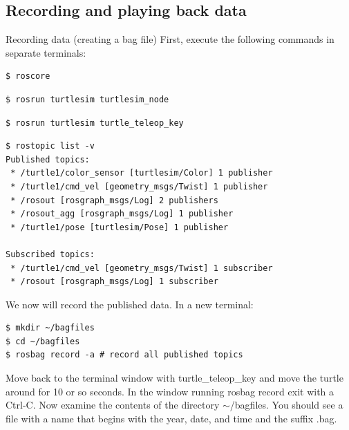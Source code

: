 \subsection{Recording and playing back data}

\begin{frame}{Recording data (creating a bag file)}
First, execute the following commands in separate terminals:
\begin{lstlisting}[language=shell]
$ roscore
\end{lstlisting}
\begin{lstlisting}[language=shell]
$ rosrun turtlesim turtlesim_node 
\end{lstlisting}
\begin{lstlisting}[language=shell]
$ rosrun turtlesim turtle_teleop_key
\end{lstlisting}
\begin{lstlisting}[language=shell]
$ rostopic list -v
Published topics:
 * /turtle1/color_sensor [turtlesim/Color] 1 publisher
 * /turtle1/cmd_vel [geometry_msgs/Twist] 1 publisher
 * /rosout [rosgraph_msgs/Log] 2 publishers
 * /rosout_agg [rosgraph_msgs/Log] 1 publisher
 * /turtle1/pose [turtlesim/Pose] 1 publisher

Subscribed topics:
 * /turtle1/cmd_vel [geometry_msgs/Twist] 1 subscriber
 * /rosout [rosgraph_msgs/Log] 1 subscriber
\end{lstlisting}

We now will record the published data. In a new terminal:
\begin{lstlisting}[language=shell]
$ mkdir ~/bagfiles
$ cd ~/bagfiles
$ rosbag record -a # record all published topics
\end{lstlisting}
Move back to the terminal window with turtle\_teleop\_key and move the turtle around for 10 or so seconds. In the window running rosbag record exit with a Ctrl-C. Now examine the contents of the directory $\sim$/bagfiles. You should see a file with a name that begins with the year, date, and time and the suffix .bag.
\end{frame}

